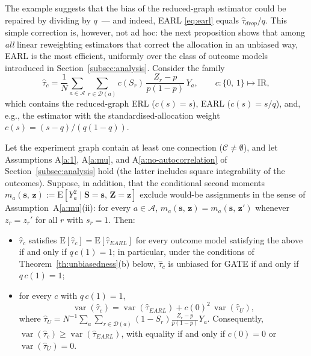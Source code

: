 \documentclass[sigconf]{acmart}
\newcommand{\E}{\mathrm E}
\newcommand{\R}{\mathrm{I}\!\mathrm{R}}
\DeclareMathOperator{\var}{var}
\begin{document}
\medskip
The example suggests that the bias of the reduced-graph estimator could be repaired by dividing by $q$~--- and indeed, EARL \eqref{eq:earl} equals $\hat\tau_{drop}/q$. This simple correction is, however, not ad hoc: the next proposition shows that among \emph{all} linear reweighting estimators that correct the allocation in an unbiased way, EARL is the most efficient, uniformly over the class of outcome models introduced in Section~\ref{subsec:analysis}. Consider the family
\begin{equation}\label{eq:class}
    \hat\tau_{c} = \frac 1 N \sum_{a\in \mathcal A} \sum_{r\in\mathcal{D}(a)}c(S_r)\,\frac{Z_r - p}{p(1-p)}\, Y_a,\qquad c\colon\{0,\,1\}\mapsto\R,
\end{equation}
which contains the reduced-graph ERL ($c(s)=s$), EARL ($c(s)=s/q$), and, e.g., the estimator with the standardised-allocation weight $c(s)=(s-q)/(q(1-q))$.

\begin{proposition}\label{prop:optimality}
    Let the experiment graph contain at least one connection ($\mathcal C\neq\emptyset$), and let Assumptions A\ref{a:1}, A\ref{a:mu}, and A\ref{a:no-autocorrelation} of Section~\ref{subsec:analysis} hold (the latter includes square integrability of the outcomes). Suppose, in addition, that the conditional second moments $m_a(\mathbf s,\,\mathbf z) := \E[Y_a^2\mid \mathbf S=\mathbf s,\,\mathbf Z=\mathbf z]$ exclude would-be assignments in the sense of Assumption~A\ref{a:mu}(ii): for every $a\in\mathcal A$, $m_a(\mathbf s,\,\mathbf z) = m_a(\mathbf s,\,\mathbf z')$ whenever $z_r=z_r'$ for all $r$ with $s_r=1$. Then:
    \begin{itemize}
        \item[\textup{(a)}] $\hat\tau_c$ satisfies $\E[\hat\tau_c]=\E[\hat\tau_{EARL}]$ for every outcome model satisfying the above if and only if $q\,c(1)=1$; in particular, under the conditions of Theorem~\ref{th:unbiasedness}(b) below, $\hat\tau_c$ is unbiased for GATE if and only if $q\,c(1)=1$;
        \item[\textup{(b)}] for every $c$ with $q\,c(1)=1$,
        \begin{equation*}
        \var(\hat\tau_c) = \var(\hat\tau_{EARL}) + c(0)^2\,\var(\hat\tau_U),
        \end{equation*}
        where $\hat\tau_U = N^{-1}\sum_{a}\sum_{r\in\mathcal D(a)}(1-S_r)\frac{Z_r-p}{p(1-p)}Y_a$. Consequently, $\var(\hat\tau_c) \ge \var(\hat\tau_{EARL})$, with equality if and only if $c(0)=0$ or $\var(\hat\tau_U)=0$.
    \end{itemize}
\end{proposition}
\end{document}
